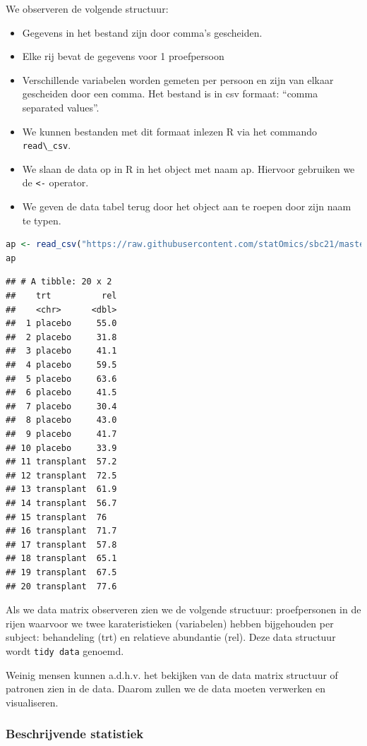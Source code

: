 \documentclass[
  12pt,dutch,coursenotes]{book}
\newcommand{\passthrough}[1]{#1}
\providecommand{\tightlist}{%
  \setlength{\itemsep}{0pt}\setlength{\parskip}{0pt}}
\theoremstyle{definition}
\theoremstyle{definition}
\theoremstyle{definition}
\theoremstyle{definition}
\theoremstyle{remark}
\begin{document}
We observeren de volgende structuur:

\begin{itemize}
\tightlist
\item
  Gegevens in het bestand zijn door comma's gescheiden.
\item
  Elke rij bevat de gegevens voor 1 proefpersoon
\item
  Verschillende variabelen worden gemeten per persoon en zijn van elkaar gescheiden door een comma. Het bestand is in csv formaat: ``comma separated values''.
\item
  We kunnen bestanden met dit formaat inlezen R via het commando \passthrough{\lstinline!read\_csv!}.
\item
  We slaan de data op in R in het object met naam ap. Hiervoor gebruiken we de \passthrough{\lstinline!<-!} operator.
\item
  We geven de data tabel terug door het object aan te roepen door zijn naam te typen.
\end{itemize}

\begin{lstlisting}[language=R]
ap <- read_csv("https://raw.githubusercontent.com/statOmics/sbc21/master/data/armpit.csv")
ap
\end{lstlisting}

\begin{lstlisting}
## # A tibble: 20 x 2
##    trt          rel
##    <chr>      <dbl>
##  1 placebo     55.0
##  2 placebo     31.8
##  3 placebo     41.1
##  4 placebo     59.5
##  5 placebo     63.6
##  6 placebo     41.5
##  7 placebo     30.4
##  8 placebo     43.0
##  9 placebo     41.7
## 10 placebo     33.9
## 11 transplant  57.2
## 12 transplant  72.5
## 13 transplant  61.9
## 14 transplant  56.7
## 15 transplant  76  
## 16 transplant  71.7
## 17 transplant  57.8
## 18 transplant  65.1
## 19 transplant  67.5
## 20 transplant  77.6
\end{lstlisting}

Als we data matrix observeren zien we de volgende structuur:
proefpersonen in de rijen waarvoor we twee karateristieken (variabelen) hebben bijgehouden per subject:
behandeling (trt) en relatieve abundantie (rel).
Deze data structuur wordt \passthrough{\lstinline!tidy data!} genoemd.

Weinig mensen kunnen a.d.h.v. het bekijken van de data matrix structuur of patronen zien in de data. Daarom zullen we de data moeten verwerken en visualiseren.

\hypertarget{beschrijvende-statistiek}{%
\subsubsection{Beschrijvende statistiek}\label{beschrijvende-statistiek}}
\end{document}
